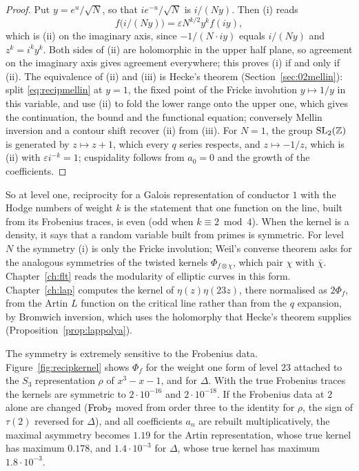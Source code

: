 \begin{proof}
Put $y=e^u/\sqrt N$, so that $ie^{-u}/\sqrt N$ is $i/(Ny)$. Then (i) reads
\[
f\bigl(i/(Ny)\bigr)=\varepsilon N^{k/2}y^kf(iy),
\]
which is (ii) on the imaginary axis, since $-1/(N\cdot iy)$ equals $i/(Ny)$ and $z^k=i^ky^k$. Both sides of (ii) are holomorphic in the upper half plane, so agreement on the imaginary axis gives agreement everywhere; this proves (i) if and only if (ii). The equivalence of (ii) and (iii) is Hecke's theorem \cite{hecke1936} (Section~\ref{sec:02mellin}): split \eqref{eq:recipmellin} at $y=1$, the fixed point of the Fricke involution $y\mapsto1/y$ in this variable, and use (ii) to fold the lower range onto the upper one, which gives the continuation, the bound and the functional equation; conversely Mellin inversion and a contour shift recover (ii) from (iii). For $N=1$, the group $\mathrm{SL}_2(\mathbb{Z})$ is generated by $z\mapsto z+1$, which every $q$ series respects, and $z\mapsto-1/z$, which is (ii) with $\varepsilon i^{-k}=1$; cuspidality follows from $a_0=0$ and the growth of the coefficients.
\end{proof}

So at level one, reciprocity for a Galois representation of conductor $1$ with the Hodge numbers of weight $k$ is the statement that one function on the line, built from its Frobenius traces, is even (odd when $k\equiv2\bmod4$). When the kernel is a density, it says that a random variable built from primes is symmetric. For level $N$ the symmetry (i) is only the Fricke involution; Weil's converse theorem asks for the analogous symmetries of the twisted kernels $\Phi_{f\otimes\chi}$, which pair $\chi$ with $\bar\chi$. Chapter~\ref{ch:flt} reads the modularity of elliptic curves in this form. Chapter~\ref{ch:lap} computes the kernel of $\eta(z)\eta(23z)$, there normalised as $2\Phi_f$, from the Artin $L$ function on the critical line rather than from the $q$ expansion, by Bromwich inversion, which uses the holomorphy that Hecke's theorem supplies (Proposition~\ref{prop:lappolya}).

The symmetry is extremely sensitive to the Frobenius data. Figure~\ref{fig:recipkernel} shows $\Phi_f$ for the weight one form of level $23$ attached to the $S_3$ representation $\rho$ of $x^3-x-1$, and for $\Delta$. With the true Frobenius traces the kernels are symmetric to $2\cdot10^{-16}$ and $2\cdot10^{-18}$. If the Frobenius data at $2$ alone are changed ($\operatorname{Frob}_2$ moved from order three to the identity for $\rho$, the sign of $\tau(2)$ reversed for $\Delta$), and all coefficients $a_n$ are rebuilt multiplicatively, the maximal asymmetry becomes $1.19$ for the Artin representation, whose true kernel has maximum $0.178$, and $1.4\cdot10^{-3}$ for $\Delta$, whose true kernel has maximum $1.8\cdot10^{-3}$.

